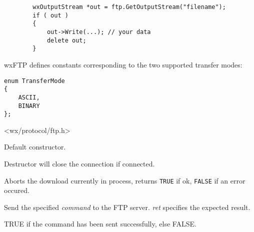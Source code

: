 \begin{verbatim}
        wxOutputStream *out = ftp.GetOutputStream("filename");
        if ( out )
        {
            out->Write(...); // your data
            delete out;
        }
\end{verbatim}


wxFTP defines constants corresponding to the two supported transfer modes:

\begin{verbatim}
enum TransferMode
{
    ASCII,
    BINARY
};
\end{verbatim}




<wx/protocol/ftp.h>







Default constructor.



Destructor will close the connection if connected.

\label{wxftpabort}


Aborts the download currently in process, returns {\tt TRUE} if ok, {\tt FALSE} 
if an error occured.



Send the specified {\it command} to the FTP server. {\it ret} specifies
the expected result.


TRUE if the command has been sent successfully, else FALSE.

